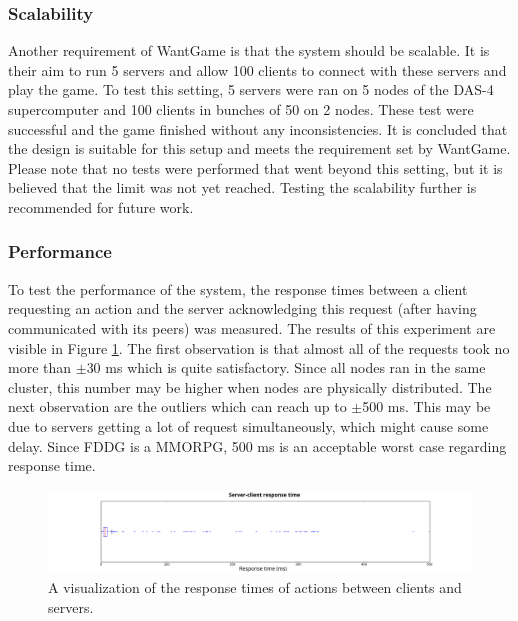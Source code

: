 	\subsubsection{Scalability}
	\label{subsubsec:scalability} 
		Another requirement of WantGame is that the system should be scalable. It is their aim to run 5 servers and allow 100 clients to connect with these servers and play the game.
		To test this setting, 5 servers were ran on 5 nodes of the DAS-4 supercomputer and 100 clients in bunches of 50 on 2 nodes. These test were successful and the game finished without any inconsistencies. It is concluded that the design is suitable for this setup and meets the requirement set by WantGame.
		Please note that no tests were performed that went beyond this setting, but it is believed that the limit was not yet reached. Testing the scalability further is recommended for future work.
		
	\subsubsection{Performance}
	\label{subsubsec:performance}
		To test the performance of the system, the response times between a client requesting an action and the server acknowledging this request (after having communicated with its peers) was measured. 
		The results of this experiment are visible in Figure \ref{fig:boxplot_response_times}.
		The first observation is that almost all of the requests took no more than $\pm$30 ms which is quite satisfactory. Since all nodes ran in the same cluster, this number may be higher when nodes are physically distributed.
		The next observation are the outliers which can reach up to $\pm$500 ms. 
		This may be due to servers getting a lot of request simultaneously, which might cause some delay.
		Since FDDG is a MMORPG, 500 ms is an acceptable worst case regarding response time.
		
		\begin{figure}[h!]
		  \centering
		    \includegraphics[width=\textwidth]{images/boxplot_reposonse_times_horizontal}
		    
		  \caption{A visualization of the response times of actions between clients and servers.}
		  \label{fig:boxplot_response_times}
		\end{figure}
		
